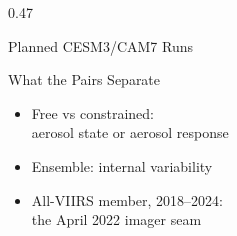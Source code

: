 \begin{frame}[t]
\begin{columns}[T]
\begin{column}{0.47\textwidth}
\begin{block}{Planned CESM3/CAM7 Runs}
\end{block}
\begin{block}{What the Pairs Separate}
\begin{itemize}
  \item Free vs constrained:\\aerosol state or aerosol response
  \item Ensemble: internal variability
  \item All-VIIRS member, 2018--2024:\\the April 2022 imager seam
\end{itemize}
\end{block}
\end{column}
\end{columns}
\end{frame}
